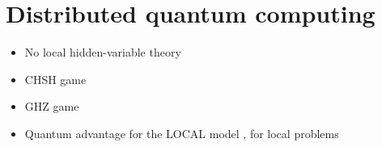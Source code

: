 \documentclass[a4paper,11pt]{article}
\begin{document}
\section{Distributed quantum computing}
\begin{itemize}
    \item No local hidden-variable theory \cite{bell-1964-on-the-einstein-podolsky-rosen-paradox}
    \item CHSH game \cite{clauser-horne-etal-1969-proposed-experiment-to-test}
    \item GHZ game \cite{greenberger-horne-zeilinger-1989-going-beyond-bell-s}
    \item Quantum advantage for the LOCAL model \cite{le-gall-nishimura-rosmanis-2019-quantum-advantage-for}, for local problems \cite{balliu-brandt-etal-2025-distributed-quantum-advantage,balliu-casagrande-etal-2025-distributed-quantum}
\end{itemize}



\end{document}
